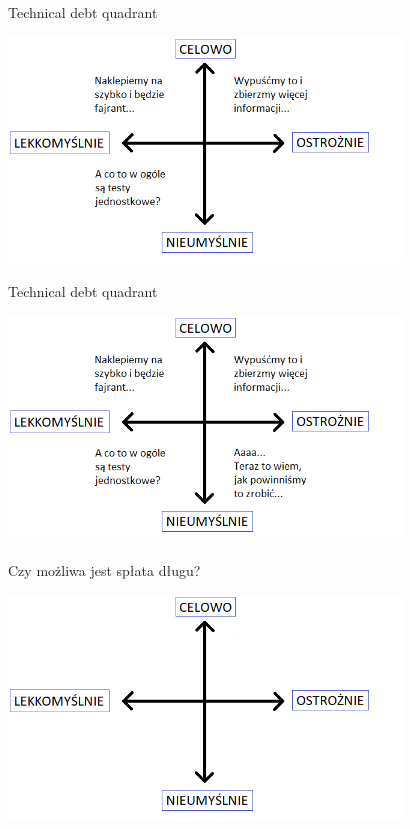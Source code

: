 \documentclass{beamer}
\begin{document}
\begin{frame}{Technical debt quadrant}
\begin{center}
  	\includegraphics[height=6cm]{technical_debt_quadrant5.png}
\end{center}
\end{frame}

\begin{frame}{Technical debt quadrant}
\begin{center}
  	\includegraphics[height=6cm]{technical_debt_quadrant6.png}
\end{center}
\end{frame}

\begin{frame}{Czy możliwa jest spłata długu{?}}
\begin{center}
  	\includegraphics[height=6cm]{splata_dlugu1.png}
\end{center}
\end{frame}
\end{document}

